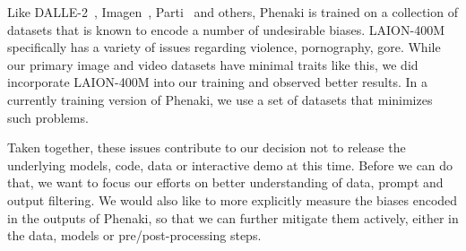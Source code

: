 Like DALLE-2~\cite{ramesh2022hierarchical}, Imagen~\cite{saharia2022photorealistic}, Parti~\cite{PARTI} and others, Phenaki is trained on a collection of datasets that is known to encode a number of undesirable biases. LAION-400M~\cite{schuhmann2021laion} specifically has a variety of issues regarding violence, pornography, gore. While our primary image and video datasets have minimal traits like this, we did incorporate LAION-400M into our training and observed better results. In a currently training version of Phenaki, we use a set of datasets that minimizes such problems.

Taken together, these issues contribute to our decision not to release the underlying models, code, data or interactive demo at this time. Before we can do that, we want to focus our efforts on better understanding of data, prompt and output filtering. We would also like to more explicitly measure the biases encoded in the outputs of Phenaki, so that we can further mitigate them actively, either in the data, models or pre/post-processing steps.


